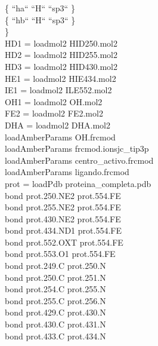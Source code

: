 \begin{adjustwidth}{1.0cm}{}
{                \hspace{0.5cm}    \{ ``ha`` ``H``  ``sp3`` \}\\
                \hspace{0.5cm}    \{ ``hb`` ``H``  ``sp3`` \}\\
                \}\\
                HD1 = loadmol2 HID250.mol2\\
                HD2 = loadmol2 HID255.mol2\\
                HD3 = loadmol2 HID430.mol2\\
                HE1 = loadmol2 HIE434.mol2\\
                IE1 = loadmol2 ILE552.mol2\\
                OH1 = loadmol2 OH.mol2\\
                FE2 = loadmol2 FE2.mol2\\
                DHA = loadmol2 DHA.mol2\\
                loadAmberParams OH.frcmod\\
                loadAmberParams frcmod.ionsjc\_tip3p\\
                loadAmberParams centro\_activo.frcmod\\
                loadAmberParams ligando.frcmod \\
                prot = loadPdb proteina\_completa.pdb\\
                bond prot.250.NE2 prot.554.FE\\
                bond prot.255.NE2 prot.554.FE\\
                bond prot.430.NE2 prot.554.FE\\
                bond prot.434.ND1 prot.554.FE\\
                bond prot.552.OXT prot.554.FE\\
                bond prot.553.O1  prot.554.FE\\
                bond prot.249.C   prot.250.N\\
                bond prot.250.C   prot.251.N\\
                bond prot.254.C   prot.255.N\\
                bond prot.255.C   prot.256.N\\
                bond prot.429.C   prot.430.N\\
                bond prot.430.C   prot.431.N\\
                bond prot.433.C   prot.434.N\\
}
\end{adjustwidth}
